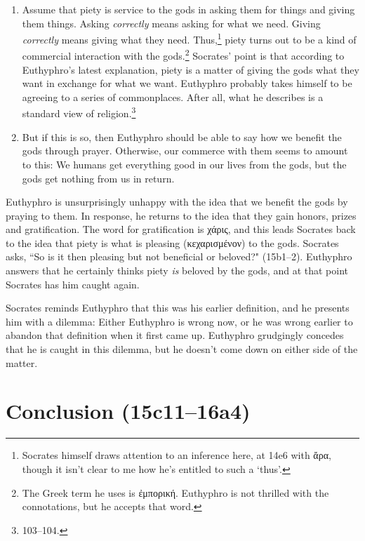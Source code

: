 \documentclass[11pt]{article}
\begin{document}
\begin{enumerate}
    \item Assume that piety is service to the gods in asking them for things and giving them things.  Asking \emph{correctly} means asking for what we need.  Giving \emph{correctly} means giving what they need.  Thus,\footnote{Socrates himself draws attention to an inference here, at 14e6 with {\g ἄρα}, though it isn't clear to me how he's entitled to such a `thus'.} piety turns out to be a kind of commercial interaction with the gods.\footnote{The Greek term he uses is {\g ἐμπορική}.  Euthyphro is not thrilled with the connotations, but he accepts that word.}  Socrates' point is that according to Euthyphro's latest explanation, piety is a matter of giving the gods what they want in exchange for what we want.  Euthyphro probably takes himself to be agreeing to a series of commonplaces.  After all, what he describes is a standard  view of religion.\footnote{\citet{bailly2003} 103--104.}
    \item But if this is so, then Euthyphro should be able to say how we benefit the gods through prayer.  Otherwise, our commerce with them seems to amount to this: We humans get everything good in our lives from the gods, but the gods get nothing from us in return.
\end{enumerate}

Euthyphro is unsurprisingly unhappy with the idea that we benefit the gods by praying to them. In response, he returns to the idea that they gain honors, prizes and gratification.  The word for gratification is {\g χάρις}, and this leads Socrates back to the idea that piety is what is pleasing ({\g κεχαρισμένον}) to the gods.  Socrates asks, ``So is it then pleasing but not beneficial or beloved?" (15b1--2).  Euthyphro answers that he certainly thinks piety \emph{is} beloved by the gods, and at that point Socrates has him caught again.

Socrates reminds Euthyphro that this was his earlier definition, and he presents him with a dilemma: Either Euthyphro is wrong now, or he was wrong earlier to abandon that definition when it first came up.  Euthyphro grudgingly concedes that he is caught in this dilemma, but he doesn't come down on either side of the matter.


\section{Conclusion (15c11--16a4)}
\end{document}
